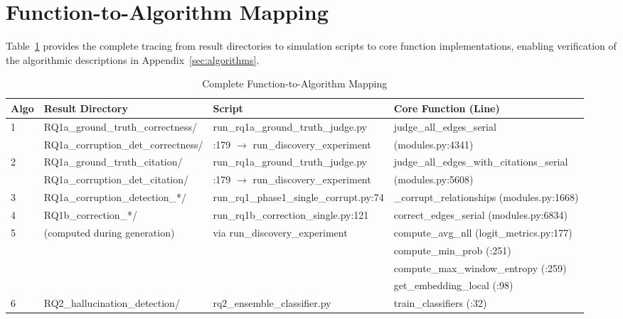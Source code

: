 \appendix

\section{Function-to-Algorithm Mapping}
\label{sec:function_mapping}

Table~\ref{tab:function_mapping} provides the complete tracing from result directories to simulation scripts to core function implementations, enabling verification of the algorithmic descriptions in Appendix~\ref{sec:algorithms}.

\begin{table}[H]
\centering
\caption{Complete Function-to-Algorithm Mapping}
\label{tab:function_mapping}
\footnotesize
\begin{tabularx}{\textwidth}{@{}l l l X@{}}
\toprule
\textbf{Algo} & \textbf{Result Directory} & \textbf{Script} & \textbf{Core Function (Line)} \\
\midrule
\multirow{2}{*}{1} & RQ1a\_ground\_truth\_correctness/ & run\_rq1a\_ground\_truth\_judge.py & judge\_all\_edges\_serial \\
 & RQ1a\_corruption\_det\_correctness/ & :179 $\rightarrow$ run\_discovery\_experiment & (modules.py:4341) \\
\midrule
\multirow{2}{*}{2} & RQ1a\_ground\_truth\_citation/ & run\_rq1a\_ground\_truth\_judge.py & judge\_all\_edges\_with\_citations\_serial \\
 & RQ1a\_corruption\_det\_citation/ & :179 $\rightarrow$ run\_discovery\_experiment & (modules.py:5608) \\
\midrule
3 & RQ1a\_corruption\_detection\_*/ & run\_rq1\_phase1\_single\_corrupt.py:74 & \_corrupt\_relationships (modules.py:1668) \\
\midrule
4 & RQ1b\_correction\_*/ & run\_rq1b\_correction\_single.py:121 & correct\_edges\_serial (modules.py:6834) \\
\midrule
\multirow{4}{*}{5} & \multirow{4}{*}{(computed during generation)} & \multirow{4}{*}{via run\_discovery\_experiment} & compute\_avg\_nll (logit\_metrics.py:177) \\
 & & & compute\_min\_prob (:251) \\
 & & & compute\_max\_window\_entropy (:259) \\
 & & & get\_embedding\_local (:98) \\
\midrule
6 & RQ2\_hallucination\_detection/ & rq2\_ensemble\_classifier.py & train\_classifiers (:32) \\
\bottomrule
\end{tabularx}
\end{table}


